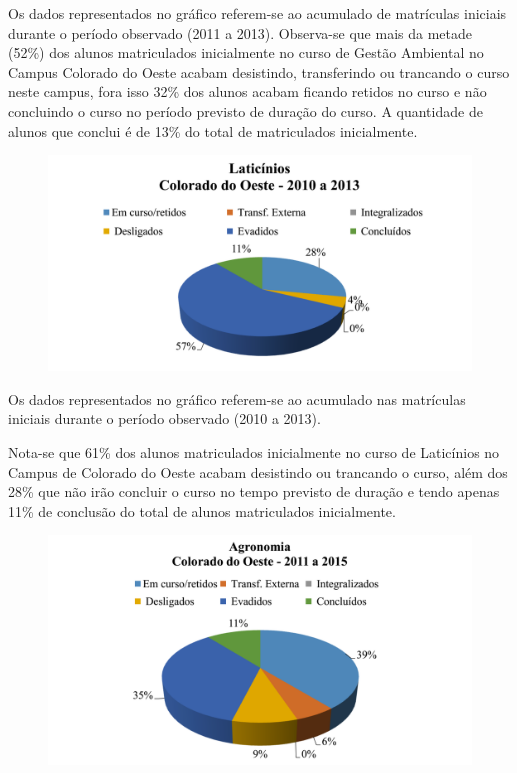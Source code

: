 \documentclass[article,12pt,onesidea,4paper,english,brazil]{abntex2}
\begin{document}
	Os dados representados no gráfico referem-se ao acumulado de matrículas iniciais durante o
	período observado (2011 a 2013).
	Observa-se que mais da metade (52\%) dos alunos matriculados inicialmente no curso de
	Gestão Ambiental no Campus Colorado do Oeste acabam desistindo, transferindo ou trancando o
	curso neste campus, fora isso 32\% dos alunos acabam ficando retidos no curso e não concluindo o
	curso no período previsto de duração do curso.
	A quantidade de alunos que conclui é de 13\% do total de matriculados inicialmente.
	
	\begin{figure}[ht]
		\centering
		\includegraphics[width=.8\linewidth]{pip-97-8}
	\end{figure}
	
	Os dados representados no gráfico referem-se ao acumulado nas matrículas iniciais durante
	o período observado (2010 a 2013).
	
	Nota-se que 61\% dos alunos matriculados inicialmente no curso de Laticínios no Campus
	de Colorado do Oeste acabam desistindo ou trancando o curso, além dos 28\% que não irão
	concluir o curso no tempo previsto de duração e tendo apenas 11\% de conclusão do total de
	alunos matriculados inicialmente.
	
	\begin{figure}[ht]
		\centering
		\includegraphics[width=0.8\linewidth]{pip-97-9}
	\end{figure}
	
\end{document}
